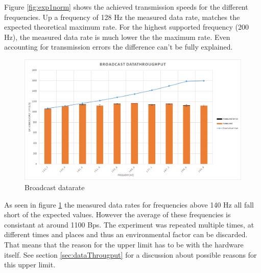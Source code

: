 \begin{description}
	Figure \ref{fig:exp1norm} shows the achieved transmission speeds for the different frequencies. Up a frequency of 128 Hz the measured data rate, matches the expected theoretical maximum rate. For the highest supported frequency (200 Hz), the measured data rate is much lower the the maximum rate. Even accounting for transmission errors the difference can't be fully explained. 
		\begin{figure}[h]
			\centering
			\includegraphics[scale=0.5]{./pics/exp1_detail.png}
			\caption{Broadcast datarate}\label{fig:exp1between}
		\end{figure}
	\newpage
	As seen in figure \ref{fig:exp1between} the measured data rates for frequencies above 140 Hz all fall short of the expected values. However the average of these frequencies is consistant at around 1100 Bps. The experiment was repeated multiple times, at different times and places and thus an environmental factor can be discarded. That means that the reason for the upper limit has to be with the hardware itself. See section \ref{sec:dataThrougput} for a discussion about possible reasons for this upper limit.				
\end{description}
\newpage

